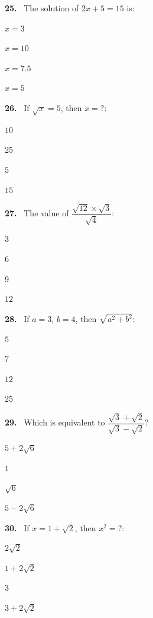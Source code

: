 \documentclass[11pt]{article}
\newenvironment{qenv}[1]{%
  \par\medskip\noindent\textbf{#1.}\ \ignorespaces
}{\par}
\begin{document}
\begin{qenv}{25} The solution of $2x+5=15$ is:
\begin{options} \item $x=3$ \item $x=10$ \item $x=7.5$ \item $x=5$ \end{options} \end{qenv}

\begin{qenv}{26} If $\sqrt{x}=5$, then $x=?$:
\begin{options} \item $10$ \item $25$ \item $5$ \item $15$ \end{options} \end{qenv}

\begin{qenv}{27} The value of $\dfrac{\sqrt{12}\times\sqrt{3}}{\sqrt{4}}$:
\begin{options} \item $3$ \item $6$ \item $9$ \item $12$ \end{options} \end{qenv}

\begin{qenv}{28} If $a=3$, $b=4$, then $\sqrt{a^2+b^2}$:
\begin{options} \item $5$ \item $7$ \item $12$ \item $25$ \end{options} \end{qenv}

\begin{qenv}{29} Which is equivalent to $\dfrac{\sqrt{3}+\sqrt{2}}{\sqrt{3}-\sqrt{2}}$?
\begin{options} \item $5+2\sqrt{6}$ \item $1$ \item $\sqrt{6}$ \item $5-2\sqrt{6}$ \end{options} \end{qenv}

\begin{qenv}{30} If $x=1+\sqrt{2}$, then $x^2=?$:
\begin{options} \item $2\sqrt{2}$ \item $1+2\sqrt{2}$ \item $3$ \item $3+2\sqrt{2}$ \end{options} \end{qenv}
\end{document}
